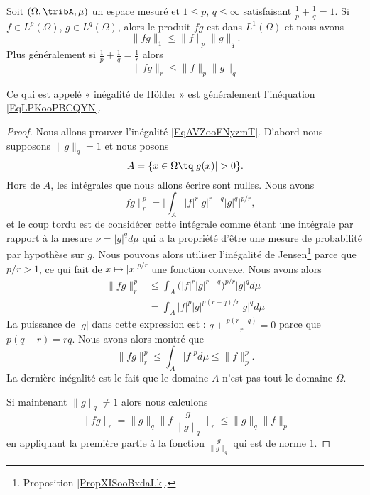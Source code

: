 \begin{proposition}       \label{ProptYqspT}
    Soit \(  (\Omega,\tribA,\mu) \) un espace mesuré et \( 1\leq p\), \( q\leq\infty\) satisfaisant \( \frac{1}{ p }+\frac{1}{ q }=1\). Si \( f\in L^p(\Omega)\), \( g\in L^q(\Omega)\), alors le produit \( fg\) est dans \( L^1(\Omega)\) et nous avons
    \begin{equation}    \label{EqLPKooPBCQYN}
        \| fg \|_1\leq \| f \|_p\| g \|_q.
    \end{equation}
    Plus généralement si \( \frac{1}{ p }+\frac{1}{ q }=\frac{1}{ r }\) alors
    \begin{equation}    \label{EqAVZooFNyzmT}
        \| fg \|_r\leq \| f \|_p\| g \|_q
    \end{equation}
\end{proposition}
Ce qui est appelé « inégalité de Hölder » est généralement l'inéquation \eqref{EqLPKooPBCQYN}.

\begin{proof}
    Nous allons prouver l'inégalité \eqref{EqAVZooFNyzmT}. D'abord nous supposons \( \| g \|_q=1\) et nous posons
    \begin{equation}
        A=\{ x\in\Omega\tq | g(x) |>0 \}.
    \end{equation}
    Hors de \( A\), les intégrales que nous allons écrire sont nulles. Nous avons
    \begin{equation}
        \| fg \|_r^p=\Big|  \int_A| f |^r| g |^{r-q}| g |^q  \Big|^{p/r},
    \end{equation}
    et le coup tordu est de considérer cette intégrale comme étant une intégrale par rapport à la mesure \( \nu=| g |^qd\mu\) qui a la propriété d'être une mesure de probabilité par hypothèse sur \( g\). Nous pouvons alors utiliser l'inégalité de Jensen\footnote{Proposition \ref{PropXISooBxdaLk}.} parce que \( p/r>1\), ce qui fait de \( x\mapsto | x |^{p/r}\) une fonction convexe. Nous avons alors
    \begin{subequations}
        \begin{align}
            \| fg \|_r^p&\leq\int_A\big( | f |^r| g |^{r-q} \big)^{p/r}| g |^qd\mu\\
            &=\int_A| f |^{p}| g |^{p(r-q)/r}| g |^qd\mu
        \end{align}
    \end{subequations}
    La puissance de \( | g |\) dans cette expression est : \( q+\frac{ p(r-q) }{ r }=0\) parce que \( p(q-r)=rq\). Nous avons alors montré que
    \begin{equation}
        \| fg \|_r^p\leq \int_A| f |^pd\mu\leq \| f \|_p^p.
    \end{equation}
    La dernière inégalité est le fait que le domaine \( A\) n'est pas tout le domaine \( \Omega\).

    Si maintenant \( \| g \|_q\neq 1\) alors nous calculons
    \begin{equation}
        \| fg \|_r=\| g \|_q\| f\frac{ g }{ \| g \|_q } \|_r\leq \| g \|_q\| f \|_p
    \end{equation}
    en appliquant la première partie à la fonction \( \frac{ g }{ \| g \|_q }\) qui est de norme \( 1\).
\end{proof}


